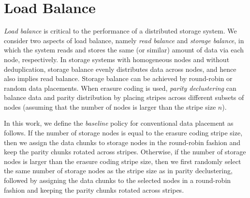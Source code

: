 \section{Load Balance}
\label{sec:motivate}

{\em Load balance} is critical to the performance of a distributed storage
system.  We consider two aspects of load balance, namely {\em read balance}
and {\em storage balance}, in which the system reads and stores the same (or
similar) amount of data via each node, respectively.  In storage systems with
homogeneous nodes and without deduplication, storage balance evenly distributes
data across nodes, and hence also implies read balance.  Storage balance can
be achieved by round-robin or random data placements.  When erasure coding is
used, {\em parity declustering} \cite{Holland94} can balance data and parity
distribution by placing stripes across different subsets of nodes (assuming
that the number of nodes is larger than the stripe size $n$). 

In this work, we define the {\em baseline} policy for conventional data
placement as follows. If the number of storage nodes is equal to the erasure 
coding stripe size, then we assign the data chunks to storage nodes in the
round-robin fashion and keep the parity chunks rotated across stripes.
Otherwise, if the number of storage nodes is larger than the erasure coding
stripe size, then we first randomly select the same number of storage nodes as
the stripe size as in parity declustering, followed by assigning the data
chunks to the selected nodes in a round-robin fashion and keeping the parity
chunks rotated across stripes. 


%

